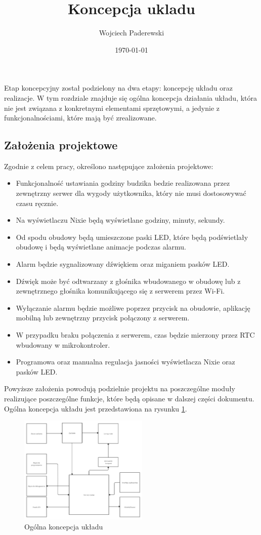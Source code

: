 \documentclass[../main.tex]{subfiles}
\author{Wojciech Paderewski}
\date{\today}
\title{Koncepcja ukladu}
\begin{document}
 Etap koncepcyjny został podzielony na dwa etapy: koncepcję układu oraz realizacje. W tym rozdziale znajduje się ogólna koncepcja 
 działania układu, która nie jest związana z konkretnymi elementami sprzętowymi, a jedynie z funkcjonalnościami, które mają być zrealizowane.
 \subsection{Założenia projektowe}
Zgodnie z celem pracy, określono następujące założenia projektowe:
\begin{itemize}
    \item Funkcjonalność ustawiania godziny budzika bedzie realizowana przez zewnętrzny serwer dla wygody użytkownika, który nie musi dostosowywać czasu ręcznie.
    \item Na wyświetlaczu Nixie będą wyświetlane godziny, minuty, sekundy.
    \item Od spodu obudowy będą umieszczone paski LED, które będą podświetlały obudowę i będą wyświetlane animacje podczas alarmu.
    \item Alarm będzie sygnalizowany dźwiękiem oraz miganiem pasków LED.
    \item Dźwięk może być odtwarzany z głośnika wbudowanego w obudowę lub z zewnętrznego głośnika komunikującego się z serwerem przez Wi-Fi.
    \item Wyłączanie alarmu będzie możliwe poprzez przycisk na obudowie, aplikację mobilną lub zewnętrzny przycisk połączony z serwerem.
    \item W przypadku braku połączenia z serwerem, czas będzie mierzony przez RTC wbudowany w mikrokontroler.
    \item Programowa oraz manualna regulacja jasności wyświetlacza Nixie oraz pasków LED.
\end{itemize}
Powyższe założenia powodują podzielnie projektu na poszczególne moduły realizujące poszczególne funkcje, które będą opisane w dalszej części dokumentu.
Ogólna koncepcja układu jest przedstawiona na rysunku \ref{fig:concept}.
\begin{figure}[H]
    \centering
    \includegraphics[width=0.55\textwidth]{Nixie-concept.png}
    \caption{Ogólna koncepcja układu}
    \label{fig:concept}
\end{figure}
\end{document}
